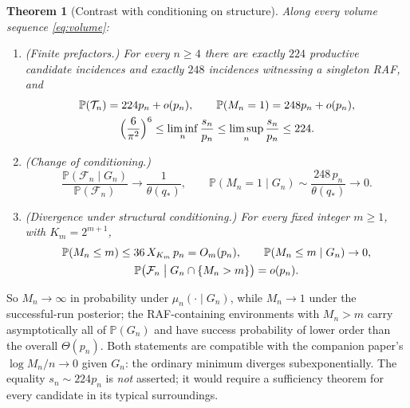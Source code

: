 \documentclass[11pt,letterpaper]{article}
\theoremstyle{plain}
\newtheorem{theorem}{Theorem}[section]
\theoremstyle{definition}
\theoremstyle{remark}
\numberwithin{equation}{section}
\newcommand{\PP}{\mathbb P}
\newcommand{\cF}{\mathcal F}
\newcommand{\cT}{\mathcal T}
\newcommand{\thetaq}{\theta(q_*)}
\begin{document}
\begin{theorem}[Contrast with conditioning on structure]\label{thm:contrast}
Along every volume sequence \eqref{eq:volume}:
\begin{enumerate}[label=\textup{(\alph*)}]
\item\label{it:counts} \textup{(Finite prefactors.)} For every $n\ge4$ there are exactly $224$ productive candidate incidences and exactly $248$ incidences witnessing a singleton RAF, and
\begin{equation}\label{eq:prefactors}
\begin{gathered}
 \PP(\cT_n)=224p_n+o(p_n),\qquad \PP(M_n=1)=248p_n+o(p_n),\\
 \Bigl(\frac6{\pi^2}\Bigr)^{6}\le\liminf_n\frac{s_n}{p_n}\le\limsup_n\frac{s_n}{p_n}\le224 .
\end{gathered}
\end{equation}
\item\label{it:factor} \textup{(Change of conditioning.)}
\begin{equation}\label{eq:factor}
 \frac{\PP(\cF_n\mid G_n)}{\PP(\cF_n)}\longrightarrow\frac1{\thetaq},\qquad
 \PP(M_n=1\mid G_n)\sim\frac{248\,p_n}{\thetaq}\longrightarrow0 .
\end{equation}
\item\label{it:diverge} \textup{(Divergence under structural conditioning.)} For every fixed integer $m\ge1$, with $K_m=2^{m+1}$,
\begin{equation}\label{eq:diverge}
\begin{gathered}
 \PP(M_n\le m)\le36\,X_{K_m}\,p_n=O_m(p_n),\qquad
 \PP(M_n\le m\mid G_n)\to0,\\
 \PP\bigl(\cF_n\bigm|G_n\cap\{M_n>m\}\bigr)=o(p_n) .
\end{gathered}
\end{equation}
\end{enumerate}
\end{theorem}
So $M_n\to\infty$ in probability under $\mu_n(\cdot\mid G_n)$, while $M_n\to1$ under the successful-run posterior; the RAF-containing environments with $M_n>m$ carry asymptotically all of $\PP(G_n)$ and have success probability of lower order than the overall $\Theta(p_n)$. Both statements are compatible with the companion paper's $\log M_n/n\to0$ given $G_n$: the ordinary minimum diverges subexponentially. The equality $s_n\sim224p_n$ is \emph{not} asserted; it would require a sufficiency theorem for every candidate in its typical surroundings.
\end{document}
